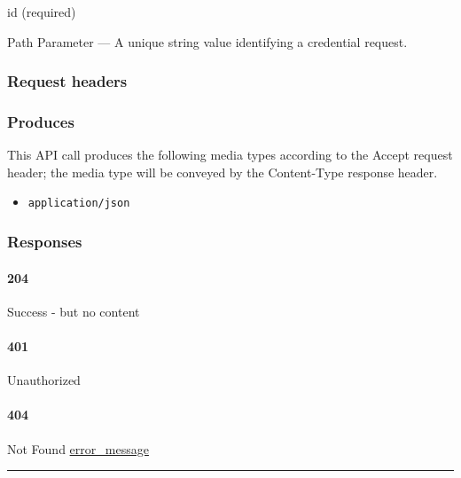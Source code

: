 id (required)

{Path Parameter} --- A unique string value identifying a credential
request.

\hypertarget{request-headers-39}{%
\subsubsection{Request headers}\label{request-headers-39}}

\hypertarget{produces-69}{%
\subsubsection{Produces}\label{produces-69}}

This API call produces the following media types according to the
{Accept} request header; the media type will be conveyed by the
{Content-Type} response header.

\begin{itemize}
\tightlist
\item
  \texttt{application/json}
\end{itemize}

\hypertarget{responses-69}{%
\subsubsection{Responses}\label{responses-69}}

\hypertarget{section-229}{%
\paragraph{204}\label{section-229}}

Success - but no content \protect\hyperlink{}{}

\hypertarget{section-230}{%
\paragraph{401}\label{section-230}}

Unauthorized \protect\hyperlink{}{}

\hypertarget{section-231}{%
\paragraph{404}\label{section-231}}

Not Found \protect\hyperlink{error_message}{error\_message}

\begin{center}\rule{0.5\linewidth}{\linethickness}\end{center}

